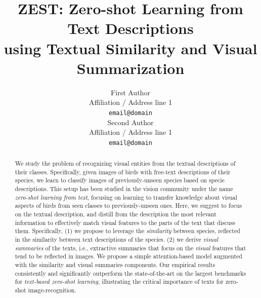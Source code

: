 \documentclass[11pt,a4paper]{article}
\title{ZEST: Zero-shot Learning from Text Descriptions\\ %
using Textual Similarity and Visual Summarization}
\author{First Author \\
 Affiliation / Address line 1 \\
 \texttt{email@domain} \\\And
 Second Author \\
 Affiliation / Address line 1 \\
 \texttt{email@domain} \\}
\date{}
\begin{document}
\maketitle


\begin{abstract}



We study the problem of recognizing visual entities from the textual descriptions of their classes. Specifically, given images of birds with free-text descriptions of their species, we learn to classify images of previously-unseen species based on specie descriptions. This setup has been studied in the vision community under the name {\em zero-shot learning from text}, focusing on learning to transfer knowledge about visual aspects of birds from seen classes to previously-unseen ones. Here, we suggest to focus on the textual description, 
%
and distill from the description the most relevant information to effectively match visual features to the parts of the text that discuss them. 
Specifically, %
(1) we propose to leverage the {\em similarity} between species, reflected in the similarity between text descriptions of the species. 
(2) we derive {\em visual summaries} of the texts, i.e., 
extractive summaries that focus on the {\em visual} features that tend to be reflected in images.
We propose a simple attention-based model augmented with  the similarity and visual summaries components. Our empirical results consistently and significantly outperform the state-of-the-art on the largest benchmarks for {\em text-based zero-shot learning}, illustrating the critical importance of texts for zero-shot image-recognition.


\end{abstract}
\end{document}
